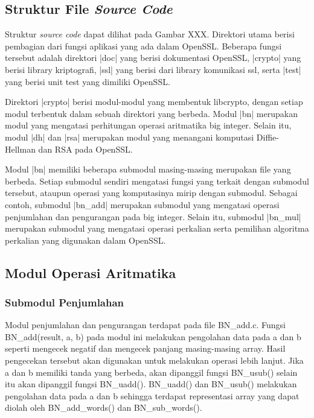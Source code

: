 
\subsection{Struktur File \textit{Source Code}}


Struktur \textit{source code} dapat dilihat pada Gambar XXX. Direktori utama berisi pembagian dari fungsi aplikasi yang ada dalam OpenSSL. Beberapa fungsi tersebut adalah direktori |doc| yang berisi dokumentasi OpenSSL, |crypto| yang berisi library kriptografi, |ssl| yang berisi dari library komunikasi ssl, serta |test| yang berisi unit test yang dimiliki OpenSSL.

Direktori |crypto| berisi modul-modul yang membentuk libcrypto, dengan setiap modul terbentuk dalam sebuah direktori yang berbeda. Modul |bn| merupakan modul yang mengatasi perhitungan operasi aritmatika big integer. Selain itu, modul |dh| dan |rsa| merupakan modul yang menangani komputasi Diffie-Hellman dan RSA pada OpenSSL.

Modul |bn| memiliki beberapa submodul masing-masing merupakan file yang berbeda. Setiap submodul sendiri mengatasi fungsi yang terkait dengan submodul tersebut, ataupun operasi yang komputasinya mirip dengan submodul. Sebagai contoh, submodul |bn_add| merupakan submodul yang mengatasi operasi penjumlahan dan pengurangan pada big integer. Selain itu, submodul |bn_mul| merupakan submodul yang mengatasi operasi perkalian serta pemilihan algoritma perkalian yang digunakan dalam OpenSSL.

\subsection{Modul Operasi Aritmatika}
\subsubsection{Submodul Penjumlahan}
Modul penjumlahan dan pengurangan terdapat pada file BN\_add.c. Fungsi BN\_add(result, a, b) pada modul ini melakukan pengolahan data pada a dan b seperti mengecek negatif dan mengecek panjang masing-masing array. Hasil pengecekan tersebut akan digunakan untuk melakukan operasi lebih lanjut. Jika a dan b memiliki tanda yang berbeda, akan dipanggil fungsi BN\_usub() selain itu akan dipanggil fungsi BN\_uadd(). BN\_uadd() dan BN\_usub() melakukan pengolahan data pada a dan b sehingga terdapat representasi array yang dapat diolah oleh BN\_add\_words() dan BN\_sub\_words().

